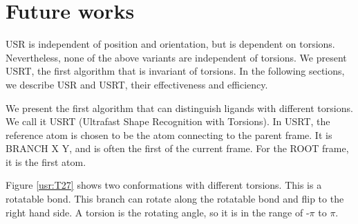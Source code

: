 \section{Future works}

USR is independent of position and orientation, but is dependent on torsions. Nevertheless, none of the above variants are independent of torsions. We present USRT, the first algorithm that is invariant of torsions. In the following sections, we describe USR and USRT, their effectiveness and efficiency.

We present the first algorithm that can distinguish ligands with different torsions. We call it USRT (Ultrafast Shape Recognition with Torsions). In USRT, the reference atom is chosen to be the atom connecting to the parent frame. It is BRANCH X Y, and is often the first of the current frame. For the ROOT frame, it is the first atom.

Figure \ref{usr:T27} shows two conformations with different torsions. This is a rotatable bond. This branch can rotate along the rotatable bond and flip to the right hand side. A torsion is the rotating angle, so it is in the range of -$\pi$ to $\pi$. 

